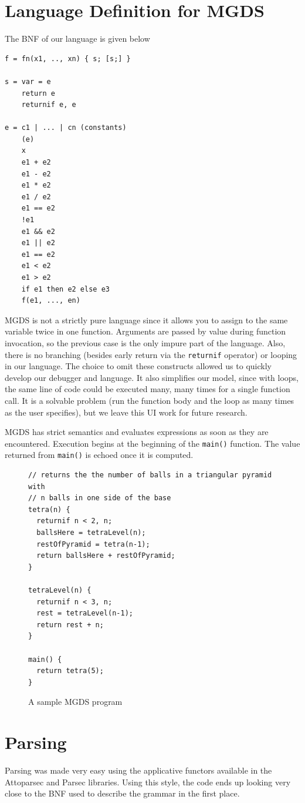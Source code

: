\documentclass[letterpaper, 10pt]{article}
\newcommand{\ttt}{\texttt}
\begin{document}
\section{Language Definition for MGDS}
The BNF of our language is given below
\begin{verbatim}
f = fn(x1, .., xn) { s; [s;] }

s = var = e
    return e
    returnif e, e

e = c1 | ... | cn (constants)
    (e)
    x
    e1 + e2
    e1 - e2
    e1 * e2
    e1 / e2
    e1 == e2
    !e1
    e1 && e2
    e1 || e2
    e1 == e2
    e1 < e2
    e1 > e2
    if e1 then e2 else e3
    f(e1, ..., en)
\end{verbatim}
MGDS is not a strictly pure language since it allows you to assign to the
same variable twice in one function. Arguments are passed by value during
function invocation, so the previous case is the only impure part of the
language. Also, there is no branching (besides early return via the
\ttt{returnif} operator) or looping in our language. The choice to omit
these constructs allowed us to quickly develop our debugger and
language. It also simplifies our model, since with loops, the same line of
code could be executed many, many times for a single function call. It is
a solvable problem (run the function body and the loop as many times as
the user specifies), but we leave this UI work for future research.

MGDS has strict semantics and evaluates expressions as soon as they are
encountered. Execution begins at the beginning of the \ttt{main()}
function. The value returned from \ttt{main()} is echoed once it is
computed. 


\begin{figure}
\centering
\begin{verbatim}
// returns the the number of balls in a triangular pyramid with
// n balls in one side of the base
tetra(n) {
  returnif n < 2, n;
  ballsHere = tetraLevel(n);
  restOfPyramid = tetra(n-1);
  return ballsHere + restOfPyramid;
}

tetraLevel(n) {
  returnif n < 3, n;
  rest = tetraLevel(n-1);
  return rest + n;
}

main() {
  return tetra(5);
}
\end{verbatim}
\caption{A sample MGDS program}
\end{figure}

\section{Parsing}
Parsing was made very easy using the applicative functors available in the
Attoparsec and Parsec libraries. Using this style, the code ends up
looking very close to the BNF used to describe the grammar in the
first place.
\end{document}
